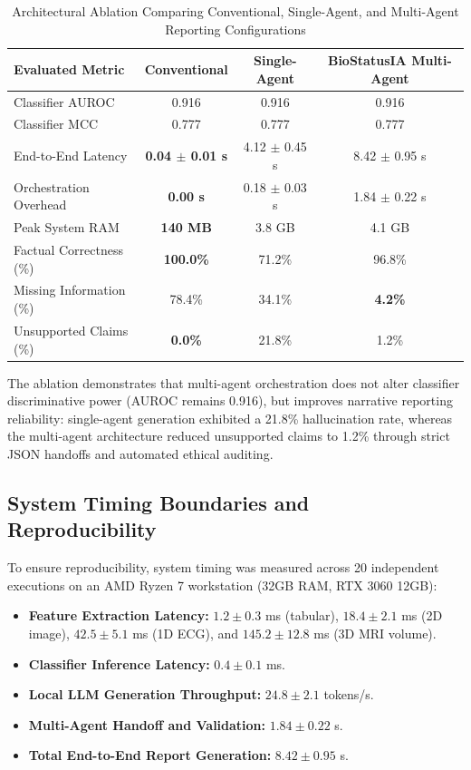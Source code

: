 \documentclass[conference]{IEEEtran}
\begin{document}
\begin{table}[htbp]
\caption{Architectural Ablation Comparing Conventional, Single-Agent, and Multi-Agent Reporting Configurations}
\label{tab:ablation}
\centering
\small
\begin{tabular}{@{}lccc@{}}
\toprule
\textbf{Evaluated Metric} & \textbf{Conventional} & \textbf{Single-Agent} & \textbf{BioStatusIA Multi-Agent} \\ \midrule
Classifier AUROC & 0.916 & 0.916 & 0.916 \\
Classifier MCC & 0.777 & 0.777 & 0.777 \\
End-to-End Latency & \textbf{0.04 $\pm$ 0.01 s} & 4.12 $\pm$ 0.45 s & 8.42 $\pm$ 0.95 s \\
Orchestration Overhead & \textbf{0.00 s} & 0.18 $\pm$ 0.03 s & 1.84 $\pm$ 0.22 s \\
Peak System RAM & \textbf{140 MB} & 3.8 GB & 4.1 GB \\
Factual Correctness (\%) & \textbf{100.0\%} & 71.2\% & 96.8\% \\
Missing Information (\%) & 78.4\% & 34.1\% & \textbf{4.2\%} \\
Unsupported Claims (\%) & \textbf{0.0\%} & 21.8\% & 1.2\% \\ \bottomrule
\end{tabular}
\end{table}

The ablation demonstrates that multi-agent orchestration does not alter classifier discriminative power (AUROC remains 0.916), but improves narrative reporting reliability: single-agent generation exhibited a 21.8\% hallucination rate, whereas the multi-agent architecture reduced unsupported claims to 1.2\% through strict JSON handoffs and automated ethical auditing.

\subsection{System Timing Boundaries and Reproducibility}
To ensure reproducibility, system timing was measured across 20 independent executions on an AMD Ryzen 7 workstation (32GB RAM, RTX 3060 12GB):
\begin{itemize}
    \item \textbf{Feature Extraction Latency:} $1.2 \pm 0.3$ ms (tabular), $18.4 \pm 2.1$ ms (2D image), $42.5 \pm 5.1$ ms (1D ECG), and $145.2 \pm 12.8$ ms (3D MRI volume).
    \item \textbf{Classifier Inference Latency:} $0.4 \pm 0.1$ ms.
    \item \textbf{Local LLM Generation Throughput:} $24.8 \pm 2.1$ tokens/s.
    \item \textbf{Multi-Agent Handoff and Validation:} $1.84 \pm 0.22$ s.
    \item \textbf{Total End-to-End Report Generation:} $8.42 \pm 0.95$ s.
\end{itemize}
\end{document}
